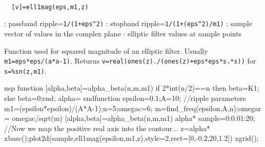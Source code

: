 
\begin{mandesc}
   \\ %
\end{mandesc}
\begin{calling_sequence}
\begin{verbatim}
  [v]=ell1mag(eps,m1,z)  
\end{verbatim}
\end{calling_sequence}
\begin{parameters}
  \begin{varlist}
    : passband ripple=\verb!1/(1+eps^2)!
    : stopband ripple=\verb!1/(1+(eps^2)/m1)!
    : sample vector of values in the complex plane
    : elliptic filter values at sample points
  \end{varlist}
\end{parameters}
\begin{mandescription}
  Function used for squared magnitude of an elliptic filter.
  Usually \verb!m1=eps*eps/(a*a-1)!. Returns 
  \verb!v=real(ones(z)./(ones(z)+eps*eps*s.*s))! for \verb!s=%sn(z,m1)!.
\end{mandescription}
\begin{examples}
  \begin{mintednsp}{nsp}
    function [alpha,beta]=alpha_beta(n,m,m1)
      if 2*int(n/2)==n then beta=K1; else beta=0;end;
      alpha=%
    endfunction
    epsilon=0.1;A=10;  //ripple parameters
    m1=(epsilon*epsilon)/(A*A-1);n=5;omegac=6;
    m=find_freq(epsilon,A,n);omegar = omegac/sqrt(m)
    [alpha,beta]=alpha_beta(n,m,m1)
    alpha*%
    sample=0:0.01:20;
    //Now we map the positive real axis into the contour...
    z=alpha*%
    xbasc();plot2d(sample,ell1mag(epsilon,m1,z),style=2,rect=[0,-0.2,20,1.2])
    xgrid();
  \end{mintednsp}
\end{examples}
\begin{manseealso}
\end{manseealso}

